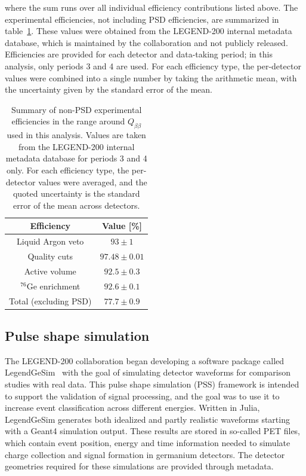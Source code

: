 \noindent where the sum runs over all individual efficiency contributions listed above. The experimental efficiencies, not including PSD efficiencies, are summarized in table~\ref{tab:exp_effs}. These values were obtained from the LEGEND-200 internal metadata database, which is maintained by the collaboration and not publicly released. Efficiencies are provided for each detector and data-taking period; in this analysis, only periods 3 and 4 are used. For each efficiency type, the per-detector values were combined into a single number by taking the arithmetic mean, with the uncertainty given by the standard error of the mean.

\begin{table}
\centering
\caption{Summary of non-PSD experimental efficiencies in the range around $Q_{\beta \beta}$ used in this analysis. Values are taken from the LEGEND-200 internal metadata database for periods 3 and 4 only. For each efficiency type, the per-detector values were averaged, and the quoted uncertainty is the standard error of the mean across detectors.}
\begin{tabular}{||c | c ||}
	\hline
 	\textbf{Efficiency}  & \textbf{Value [\%]} \\
 	\hline
	Liquid Argon veto & $93 \pm 1$  \\
 	\hline
 	Quality cuts & $97.48 \pm 0.01$ \\
 	\hline
 	Active volume & $ 92.5 \pm 0.3 $ \\
 	\hline
 	$^{76}$Ge enrichment & $ 92.6 \pm 0.1$ \\
 	\hline
	Total (excluding PSD) & $77.7 \pm 0.9$ \\
	\hline
\end{tabular}
\label{tab:exp_effs}
\end{table}



\subsection{Pulse shape simulation}

The LEGEND-200 collaboration began developing a software package called LegendGeSim~\cite{noauthor_legend-explegendgesimjl_2025} with the goal of simulating detector waveforms for comparison studies with real data. 
This pulse shape simulation (PSS) framework is intended to support the validation of signal processing, and the goal was to use it to increase event classification across different energies. 
Written in Julia, LegendGeSim generates both idealized and partly realistic waveforms starting with a Geant4 simulation output. 
These results are stored in so-called PET files, which contain event position, energy and time information needed to simulate charge collection and signal formation in germanium detectors. The detector geometries required for these simulations are provided through metadata. 

